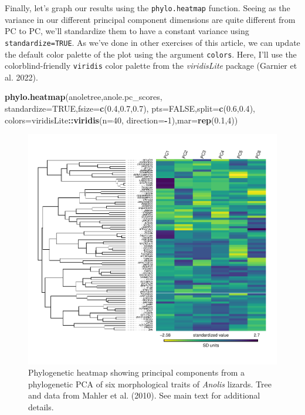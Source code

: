 \documentclass[fleqn,10pt,lineno]{wlpeerj} %
\newenvironment{Shaded}{\begin{snugshade}}{\end{snugshade}}
\newcommand{\AttributeTok}[1]{\textcolor[rgb]{0.13,0.29,0.53}{#1}}
\newcommand{\ConstantTok}[1]{\textcolor[rgb]{0.56,0.35,0.01}{#1}}
\newcommand{\DecValTok}[1]{\textcolor[rgb]{0.00,0.00,0.81}{#1}}
\newcommand{\FloatTok}[1]{\textcolor[rgb]{0.00,0.00,0.81}{#1}}
\newcommand{\FunctionTok}[1]{\textcolor[rgb]{0.13,0.29,0.53}{\textbf{#1}}}
\newcommand{\NormalTok}[1]{#1}
\newcommand{\SpecialCharTok}[1]{\textcolor[rgb]{0.81,0.36,0.00}{\textbf{#1}}}
\begin{document}
Finally, let's graph our results using the \texttt{phylo.heatmap} function. Seeing as the variance in our different principal component dimensions are quite different from PC to PC, we'll standardize them to have a constant variance using \texttt{standardize=TRUE}. As we've done in other exercises of this article, we can update the default color palette of the plot using the argument \texttt{colors}. Here, I'll use the colorblind-friendly \texttt{viridis} color palette from the \emph{viridisLite} package (Garnier et al. 2022).

\begin{Shaded}
\begin{Highlighting}[]
\FunctionTok{phylo.heatmap}\NormalTok{(anoletree,anole.pc\_scores,}
  \AttributeTok{standardize=}\ConstantTok{TRUE}\NormalTok{,}\AttributeTok{fsize=}\FunctionTok{c}\NormalTok{(}\FloatTok{0.4}\NormalTok{,}\FloatTok{0.7}\NormalTok{,}\FloatTok{0.7}\NormalTok{),}
  \AttributeTok{pts=}\ConstantTok{FALSE}\NormalTok{,}\AttributeTok{split=}\FunctionTok{c}\NormalTok{(}\FloatTok{0.6}\NormalTok{,}\FloatTok{0.4}\NormalTok{),}
  \AttributeTok{colors=}\NormalTok{viridisLite}\SpecialCharTok{::}\FunctionTok{viridis}\NormalTok{(}\AttributeTok{n=}\DecValTok{40}\NormalTok{,}
  \AttributeTok{direction=}\SpecialCharTok{{-}}\DecValTok{1}\NormalTok{),}\AttributeTok{mar=}\FunctionTok{rep}\NormalTok{(}\FloatTok{0.1}\NormalTok{,}\DecValTok{4}\NormalTok{))}
\end{Highlighting}
\end{Shaded}

\begin{figure}
\includegraphics[width=1\linewidth]{Revell.phytools-v2_peerj_files/figure-latex/anole-heatmap-1} \caption{Phylogenetic heatmap showing principal components from a phylogenetic PCA of six morphological traits of \textit{Anolis} lizards. Tree and data from Mahler et al. (2010). See main text for additional details.}\label{fig:anole-heatmap}
\end{figure}
\end{document}
